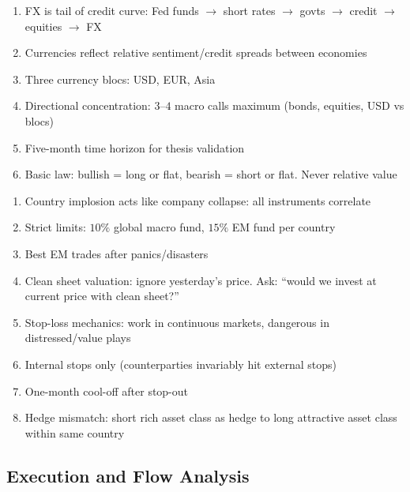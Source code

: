 \begin{remark} 
\begin{enumerate}[label=\roman*.]
\setlength{\itemsep}{0pt}
\item FX is tail of credit curve: Fed funds $\rightarrow$ short rates $\rightarrow$ govts $\rightarrow$ credit $\rightarrow$ equities $\rightarrow$ FX
\item Currencies reflect relative sentiment/credit spreads between economies
\item Three currency blocs: USD, EUR, Asia
\item Directional concentration: $3$--$4$ macro calls maximum (bonds, equities, USD vs blocs)
\item Five-month time horizon for thesis validation
\item Basic law: bullish = long or flat, bearish = short or flat. Never relative value
\end{enumerate}
\end{remark}

\begin{remark} 
\begin{enumerate}[label=\roman*.]
\setlength{\itemsep}{0pt}
\item Country implosion acts like company collapse: all instruments correlate
\item Strict limits: $10\%$ global macro fund, $15\%$ EM fund per country
\item Best EM trades after panics/disasters
\item Clean sheet valuation: ignore yesterday's price. Ask: ``would we invest at current price with clean sheet?''
\item Stop-loss mechanics: work in continuous markets, dangerous in distressed/value plays
\item Internal stops only (counterparties invariably hit external stops)
\item One-month cool-off after stop-out
\item Hedge mismatch: short rich asset class as hedge to long attractive asset class within same country
\end{enumerate}
\end{remark}

\subsection{Execution and Flow Analysis}

